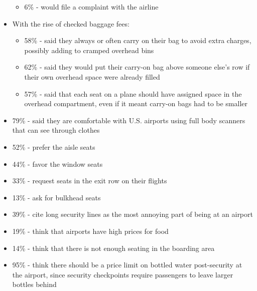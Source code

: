 \begin{itemize}
\begin{itemize}
\item 6\% - would file a complaint with the airline
\end{itemize}
\item With the rise of checked baggage fees:
\begin{itemize}
\item 58\% - said they always or often carry on their bag to avoid extra charges, possibly adding to cramped overhead bins
\item 62\% - said they would put their carry-on bag above someone else's row if their own overhead space were already filled
\item 57\% - said that each seat on a plane should have assigned space in the overhead compartment, even if it meant carry-on bags had to be smaller
\end{itemize}
\item 79\% - said they are comfortable with U.S. airports using full body scanners that can see through clothes
\item 52\% - prefer the aisle seats
\item 44\% - favor the window seats
\item 33\% - request seats in the exit row on their flights
\item 13\% - ask for bulkhead seats
\item 39\% - cite long security lines as the most annoying part of being at an airport
\item 19\% - think that airports have high prices for food
\item 14\% - think that there is not enough seating in the boarding area
\item 95\% - think there should be a price limit on bottled water post-security at the airport, since security checkpoints require passengers to leave larger bottles behind
\end{itemize}

